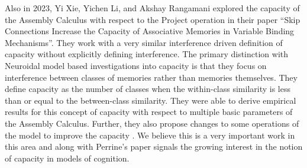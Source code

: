 Also in 2023, Yi Xie, Yichen Li, and Akshay Rangamani explored the capacity of the Assembly Calculus with respect to the Project operation in their paper ``Skip Connections Increase the Capacity of Associative Memories in Variable Binding Mechanisms''. They work with a very similar interference driven definition of capacity without explicitly defining interference. The primary distinction with Neuroidal model based investigations into capacity is that they focus on interference between classes of memories rather than memories themselves. They define capacity as the number of classes when the within-class similarity is less than or equal to the between-class similarity. They were able to derive empirical results for this concept of capacity with respect to multiple basic parameters of the Assembly Calculus. Further, they also propose changes to some operations of the model to improve the capacity \cite{xie2023skip}. We believe this is a very important work in this area and along with Perrine's paper signals the growing interest in the notion of capacity in models of cognition.




